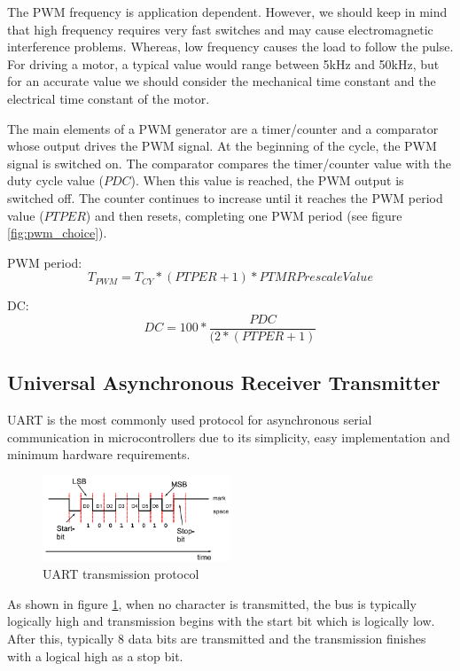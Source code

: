 \noindent
The PWM frequency is application dependent. However, we should keep in mind that high frequency requires very fast switches and may cause electromagnetic interference problems. Whereas, low frequency causes the load to follow the pulse.\\
For driving a motor, a typical value would range between 5kHz and 50kHz, but for an accurate value we should consider the mechanical time constant and the electrical time constant of the motor.


The main elements of a PWM generator are a timer/counter and a comparator whose output drives the PWM signal. At the beginning of the cycle, the PWM signal is switched on. The comparator compares the timer/counter value with the duty cycle value ($PDC$). When this value is reached, the PWM output is switched off. The counter continues to increase until it reaches the PWM period value ($PTPER$) and then resets, completing one PWM period (see figure \ref{fig:pwm_choice}).

PWM period:
$$T_{PWM}=T_{CY}*(PTPER+1)*PTMR Prescale Value$$

DC: 
$$DC=100* \frac{PDC}{(2*(PTPER+1)}$$


\subsection{Universal Asynchronous Receiver Transmitter}

UART is the most commonly used protocol for asynchronous serial communication in microcontrollers due to its simplicity, easy implementation and minimum hardware requirements.\\

\begin{figure}[H]
    \centering
    \includegraphics[width=0.5\textwidth]{figures/software/UART_com.PNG}
    \caption{UART transmission protocol\cite{alex}}
    \label{fig:uartProtocol}
\end{figure}

\noindent
As shown in figure \ref{fig:uartProtocol}, when no character is transmitted, the bus is typically logically high and transmission begins with the start bit which is logically low. After this, typically 8 data bits are transmitted and the transmission finishes with a logical high as a stop bit.\\

